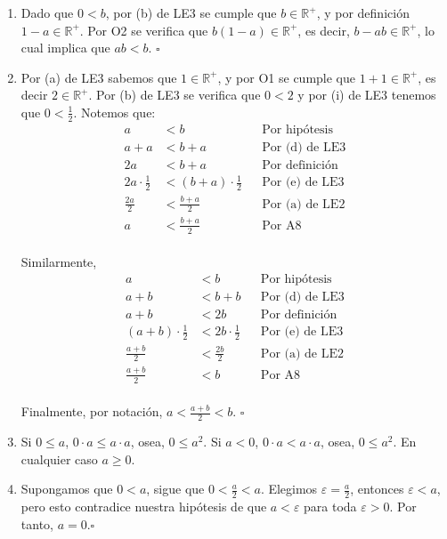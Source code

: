 \documentclass[11pt]{article}
\begin{document}
\begin{enumerate}[label=\alph*),font=\bfseries]

    \item Dado que $0<b$, por (b) de LE3 se cumple que $b \in \mathbb{R}^+$, y por definición $1-a \in \mathbb{R}^+$. Por O2 se verifica que $b(1-a) \in \mathbb{R}^+$, es decir, $b-ab \in \mathbb{R}^+$, lo cual implica que $ab<b$. \mbox{}\hfill $\square$


    \item Por (a) de LE3 sabemos que $1 \in \mathbb{R}^+$, y por O1 se cumple que $1+1 \in \mathbb{R}^+$, es decir $2 \in \mathbb{R}^+$. Por (b) de LE3 se verifica que $0<2$ y por (i) de LE3 tenemos que $0<\frac{1}{2}$. Notemos que: \begin{align*}
        a &< b && \text{Por hipótesis} \\
        a + a &< b+a && \text{Por (d) de LE3} \\
        2a &< b+a && \text{Por definición} \\
        2a \cdot \frac{1}{2} &< (b+a) \cdot \frac{1}{2} && \text{Por (e) de LE3} \\
        \frac{2a}{2} &< \frac{b+a}{2} && \text{Por (a) de LE2} \\
        a &< \frac{b+a}{2} && \text{Por A8}
    \end{align*} \\ Similarmente,
    \begin{align*}
        a &< b && \text{Por hipótesis} \\
        a + b &< b+b && \text{Por (d) de LE3} \\
        a +b &< 2b && \text{Por definición} \\
        (a+b) \cdot \frac{1}{2} &< 2b \cdot \frac{1}{2} && \text{Por (e) de LE3} \\
        \frac{a+b}{2} &< \frac{2b}{2} && \text{Por (a) de LE2} \\
        \frac{a+b}{2} &< b && \text{Por A8}
    \end{align*}\\ Finalmente, por notación, $a < \frac{a+b}{2} < b$. \mbox{}\hfill $\square$

    \item Si $0 \leq a$, $ 0\cdot a \leq a \cdot a$, osea, $0 \leq a^2$. Si $a<0$, $0\cdot a < a \cdot a$, osea, $0 \leq a^2$. En cualquier caso $a\geq0$.

    \item Supongamos que $0<a$, sigue que $0<\frac{a}{2}<a$. Elegimos $\varepsilon=\frac{a}{2}$, entonces $\varepsilon<a$, pero esto contradice nuestra hipótesis de que $a< \varepsilon$ para toda $\varepsilon>0$. Por tanto, $a=0$.\mbox{}\hfill $\square$


\end{enumerate}
\end{document}
